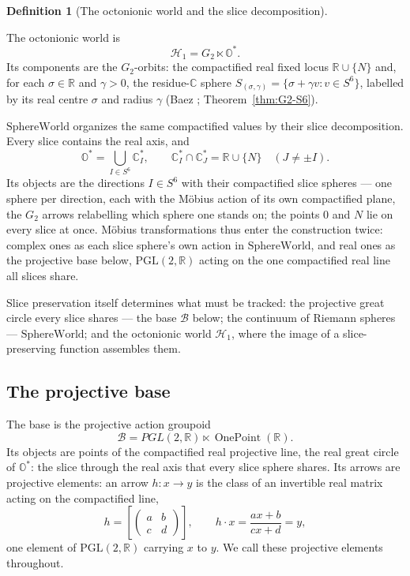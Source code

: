 \documentclass[11pt]{article}
\newcommand{\OO}{\mathbb{O}}
\newcommand{\CC}{\mathbb{C}}
\newcommand{\RR}{\mathbb{R}}
\providecommand{\Gtwo}{G_2}
\providecommand{\SphereWorld}{\mathrm{SphereWorld}}
\providecommand{\lean}[1]{}
\providecommand{\uses}[1]{}
\theoremstyle{plain}
\theoremstyle{definition}
\newtheorem{definition}[theorem]{Definition}
\theoremstyle{remark}
\begin{document}
\begin{definition}[The octonionic world and the slice decomposition]\label{def:two-worlds}
\lean{H1, SphereWorld}
\uses{def:carrier, def:G2, thm:G2-S6, rmk:G2-compact, def:slices}
The octonionic world is
\[
  \mathcal H_1=\Gtwo\ltimes\OO^{*}.
\]
Its components are the $\Gtwo$-orbits: the compactified real fixed locus $\RR\cup\{N\}$ and,
for each $\sigma\in\RR$ and $\gamma>0$, the residue-$\CC$ sphere
$S_{(\sigma,\gamma)}=\{\sigma+\gamma v:v\in S^6\}$, labelled by its real centre $\sigma$ and
radius $\gamma$ (Baez \cite{Baez02}; Theorem~\ref{thm:G2-S6}).

$\SphereWorld$ organizes the same compactified values by their slice
decomposition. Every slice contains the real axis, and
\[
  \OO^{*}=\bigcup_{I\in S^6}\CC_I^{*},\qquad
  \CC_I^{*}\cap\CC_J^{*}=\RR\cup\{N\}\quad(J\neq\pm I).
\]
Its objects are the directions $I\in S^6$ with their compactified slice
spheres --- one sphere per direction, each with the M\"obius action of
its own compactified plane, the $G_2$ arrows relabelling which sphere one
stands on; the points $0$ and $N$ lie on every slice at once. M\"obius
transformations thus enter the construction twice: complex ones as each
slice sphere's own action in $\SphereWorld$, and real ones as the
projective base below, $\mathrm{PGL}(2,\RR)$ acting on the one
compactified real line all slices share.

Slice preservation itself determines what must be tracked: the
projective great circle every slice shares --- the base $\mathcal B$
below; the continuum of Riemann spheres --- $\SphereWorld$; and the
octonionic world $\mathcal H_1$, where the image of a slice-preserving
function assembles them.
\end{definition}

\subsection*{The projective base}

The base is the projective action groupoid
\[
  \mathcal B
  =PGL(2,\RR)\ltimes\operatorname{OnePoint}(\RR).
\]
Its objects are points of the compactified real projective line, the real great circle of
$\OO^{*}$: the slice through the real axis that every slice sphere shares. Its arrows are
projective elements: an arrow $h:x\to y$ is the class of an
invertible real matrix acting on the compactified line,
\[
  h=\left[\begin{pmatrix}a&b\\[2pt]c&d\end{pmatrix}\right],\qquad
  h\cdot x=\frac{ax+b}{cx+d}=y ,
\]
one element of $\mathrm{PGL}(2,\RR)$ carrying $x$ to $y$. We call these projective
elements throughout.
\end{document}
